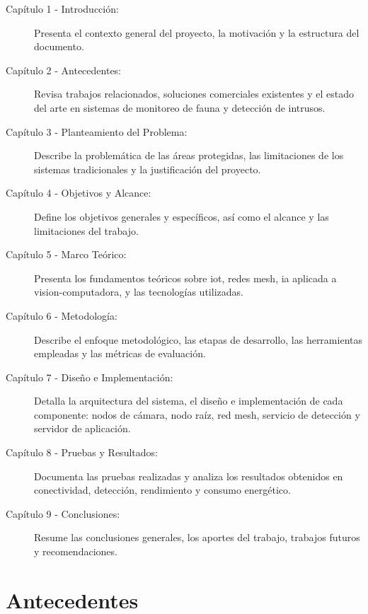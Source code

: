 \documentclass[a4paper, 12pt]{report}
\begin{document}
\begin{description}
  \item[Capítulo 1 - Introducción:] Presenta el contexto general del
    proyecto, la motivación y la estructura del documento.

  \item[Capítulo 2 - Antecedentes:] Revisa trabajos relacionados,
    soluciones comerciales existentes y el estado del arte en sistemas
    de monitoreo de fauna y detección de intrusos.

  \item[Capítulo 3 - Planteamiento del Problema:] Describe la
    problemática de las áreas protegidas, las limitaciones de los
    sistemas tradicionales y la justificación del proyecto.

  \item[Capítulo 4 - Objetivos y Alcance:] Define los objetivos
    generales y específicos, así como el alcance y las limitaciones
    del trabajo.

  \item[Capítulo 5 - Marco Teórico:] Presenta los fundamentos teóricos
    sobre \gls{iot}, redes \gls{mesh}, \gls{ia} aplicada a \gls{vision-computadora},
    y las tecnologías utilizadas.

  \item[Capítulo 6 - Metodología:] Describe el enfoque metodológico,
    las etapas de desarrollo, las herramientas empleadas y las métricas
    de evaluación.

  \item[Capítulo 7 - Diseño e Implementación:] Detalla la arquitectura
    del sistema, el diseño e implementación de cada componente: nodos
    de cámara, nodo raíz, red \gls{mesh}, servicio de detección y
    servidor de aplicación.

  \item[Capítulo 8 - Pruebas y Resultados:] Documenta las pruebas
    realizadas y analiza los resultados obtenidos en conectividad,
    detección, rendimiento y consumo energético.

  \item[Capítulo 9 - Conclusiones:] Resume las conclusiones generales,
    los aportes del trabajo, trabajos futuros y recomendaciones.
\end{description}

\chapter{Antecedentes}
\end{document}
